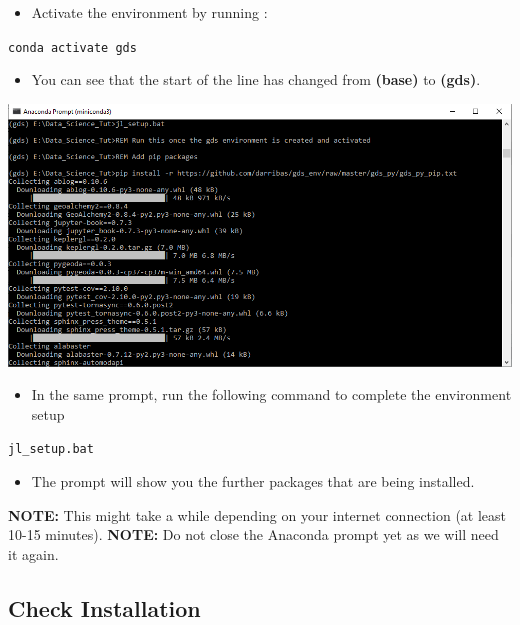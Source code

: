 \documentclass[
]{book}
\providecommand{\tightlist}{%
  \setlength{\itemsep}{0pt}\setlength{\parskip}{0pt}}
\begin{document}
\begin{itemize}
\tightlist
\item
  Activate the environment by running :
\end{itemize}

\texttt{conda\ activate\ gds}

\begin{itemize}
\tightlist
\item
  You can see that the start of the line has changed from \textbf{(base)} to \textbf{(gds)}.
\end{itemize}

\begin{center}\includegraphics[width=13.61in]{figs/chp4/Conda_9} \end{center}

\begin{itemize}
\tightlist
\item
  In the same prompt, run the following command to complete the environment setup
\end{itemize}

\texttt{jl\_setup.bat}

\begin{itemize}
\tightlist
\item
  The prompt will show you the further packages that are being installed.
\end{itemize}

\textbf{NOTE:} This might take a while depending on your internet connection (at least 10-15 minutes).
\textbf{NOTE:} Do not close the Anaconda prompt yet as we will need it again.

\hypertarget{check-installation}{%
\subsection{Check Installation}\label{check-installation}}
\end{document}
